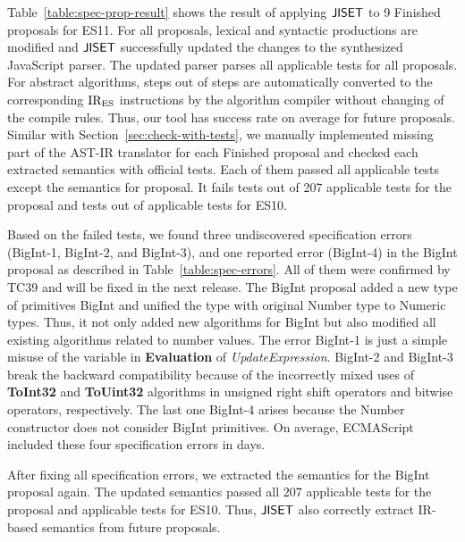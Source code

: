 Table~\ref{table:spec-prop-result} shows the result of applying \( \text{\sf JISET} \) to 9
Finished proposals for ES11.  For all proposals,  lexical and
 syntactic productions are modified and \( \text{\sf JISET} \) successfully
updated the changes to the synthesized JavaScript parser.  The updated parser
parses all applicable tests for all proposals.  For abstract algorithms,
 steps out of  steps are automatically converted to the
corresponding \( \text{IR}_\text{ES} \) instructions by the algorithm compiler without
changing of the compile rules.  Thus, our tool has  success rate
on average for future proposals.  Similar with
Section~\ref{sec:check-with-tests}, we manually implemented missing part of the
AST-IR translator for each Finished proposal and checked each extracted
semantics with official tests.  Each of them passed all applicable tests except
the semantics for  proposal.  It fails  tests out of 207
applicable tests for the proposal and  tests out of 
applicable tests for ES10.

Based on the failed tests, we found three undiscovered specification errors
(BigInt-1, BigInt-2, and BigInt-3), and one reported error (BigInt-4) in the
BigInt proposal as described in Table~\ref{table:spec-errors}.  All of
them were confirmed by TC39 and will be fixed in the next release.  The BigInt
proposal added a new type of primitives BigInt and unified the type with
original Number type to Numeric types.  Thus, it not only added new
algorithms for BigInt but also modified all existing algorithms related to
number values.  The error BigInt-1 is just a simple misuse of the variable
 in {\bf Evaluation} of {\it UpdateExpression}. BigInt-2 and
BigInt-3 break the backward compatibility because of the incorrectly mixed uses
of {\bf ToInt32} and {\bf ToUint32} algorithms in unsigned right shift operators
and bitwise operators, respectively. The last one BigInt-4 arises because the
Number constructor does not consider BigInt primitives.  On average, ECMAScript
included these four specification errors in  days.

After fixing all specification errors, we extracted the semantics for the BigInt
proposal again.  The updated semantics passed all 207 applicable tests for the
proposal and  applicable tests for ES10.  Thus, \( \text{\sf JISET} \) also
correctly extract IR-based semantics from future proposals.
